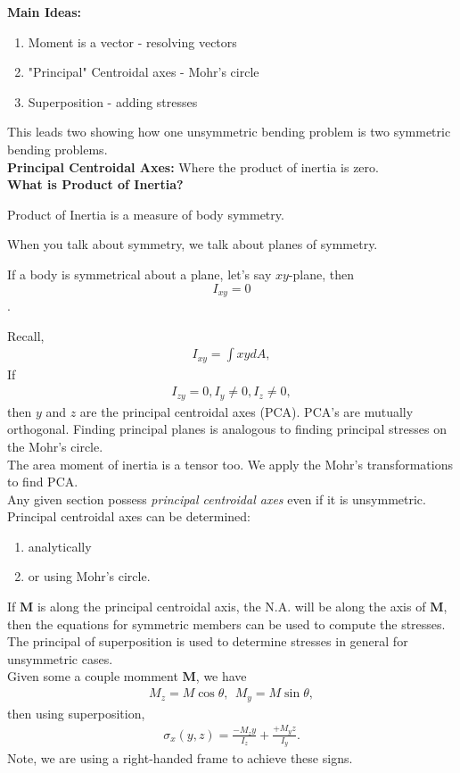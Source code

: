\documentclass{article}
\numberwithin{equation}{subsection}
\newcommand{\bb}[1]{\mathbf{#1}}
\begin{document}
\textbf{Main Ideas:}
\begin{enumerate}
  \item Moment is a vector - resolving vectors
  \item "Principal" Centroidal axes - Mohr's circle
  \item Superposition - adding stresses
\end{enumerate}
This leads two showing how one unsymmetric bending problem is two symmetric bending problems.
\\

\textbf{Principal Centroidal Axes:}
Where the product of inertia is zero. 
\\

\textbf{What is Product of Inertia?}

Product of Inertia is a measure of body symmetry.

When you talk about symmetry, we talk about planes of symmetry.

If a body is symmetrical about a plane, let's say $xy$-plane, then $$ I_{xy} = 0$$.


Recall,
\begin{align*}
  I_{xy} = \int xy dA,
\end{align*}
If
\begin{align*}
  I_{zy} = 0, I_y \neq 0, I_z \neq 0,
\end{align*}
then $y$ and $z$ are the principal centroidal axes (PCA). PCA's are mutually orthogonal.
Finding principal planes is analogous to finding principal stresses on the Mohr's circle.
\\

The area moment of inertia is a tensor too. We apply the Mohr's transformations to find PCA.
\\

Any given section possess \emph{principal centroidal axes} even if it is unsymmetric.
Principal centroidal axes can be determined: 
\begin{enumerate}
  \item analytically
  \item or using Mohr's circle.
\end{enumerate}
If $\bb{M}$ is along the principal centroidal axis, the N.A. will be along the axis of $\bb{M}$,
then the equations for symmetric members can be used to compute the stresses.
The principal of superposition is used to determine stresses in general for unsymmetric cases.
\\

Given some a couple momment $\bb{M}$, we have
\begin{align*}
  M_z = M\cos\theta,~~ M_y = M\sin\theta,
\end{align*}
then using superposition,
\begin{align*}
  \sigma_x(y,z) = \frac{-M_z y}{I_z} + \frac{+M_y z}{I_y}.
\end{align*}
Note, we are using a right-handed frame to achieve these signs.
\\
\end{document}
